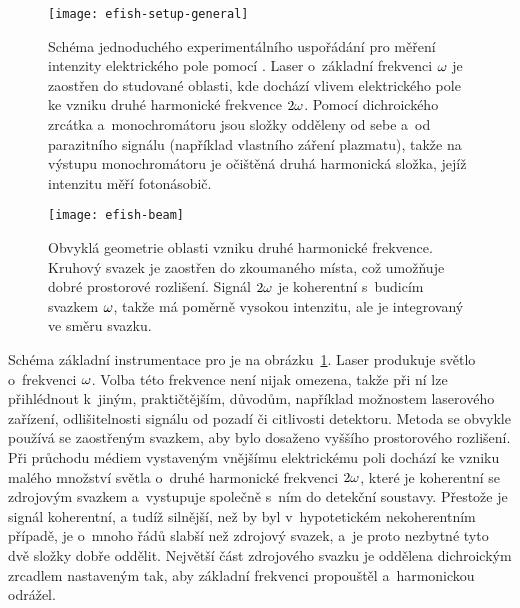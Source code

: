 \begin{figure}[p]
	\centering
	\texttt{[image: efish-setup-general]}
	\caption{Schéma jednoduchého experimentálního uspořádání pro měření
		intenzity elektrického pole pomocí \EFISH{}.
		Laser o~základní frekvenci $\omega$ je zaostřen do studované
		oblasti, kde dochází vlivem elektrického pole ke vzniku
		druhé harmonické frekvence $2\omega$.
		Pomocí dichroického zrcátka a~monochromátoru jsou složky
		odděleny od sebe a~od parazitního signálu
		(například vlastního záření plazmatu),
		takže na výstupu monochromátoru je očištěná druhá harmonická
		složka, jejíž intenzitu měří fotonásobič.}
	\label{fig:efish-setup-general}
\end{figure}

\begin{figure}[p]
	\centering
	\texttt{[image: efish-beam]}
	\caption{Obvyklá geometrie oblasti vzniku druhé harmonické frekvence.
		Kruhový svazek je zaostřen do zkoumaného místa,
		což umožňuje dobré prostorové rozlišení.
		Signál $2\omega$ je koherentní s~budicím svazkem $\omega$,
		takže má poměrně vysokou intenzitu,
		ale je integrovaný ve směru svazku.}
	\label{fig:efish-beam}
\end{figure}

Schéma základní instrumentace pro \EFISH{} je
na obrázku~\ref{fig:efish-setup-general}.
Laser produkuje světlo o~frekvenci $\omega$.
Volba této frekvence není nijak omezena, takže při ní lze přihlédnout
k~jiným, praktičtějším, důvodům, například možnostem laserového zařízení,
odlišitelnosti signálu od pozadí či citlivosti detektoru.
Metoda se obvykle používá se zaostřeným svazkem,
aby bylo dosaženo vyššího prostorového rozlišení.
Při průchodu médiem vystaveným vnějšímu elektrickému poli dochází
ke vzniku malého množství světla o~druhé harmonické frekvenci $2\omega$,
které je koherentní se zdrojovým svazkem a~vystupuje společně s~ním
do detekční soustavy.
Přestože je signál koherentní, a tudíž silnější,
než by byl v~hypotetickém nekoherentním případě,
je o~mnoho řádů slabší než zdrojový svazek, a~je proto nezbytné
tyto dvě složky dobře oddělit.
Největší část zdrojového svazku je oddělena dichroickým zrcadlem
nastaveným tak, aby základní frekvenci propouštěl a~harmonickou odrážel.
